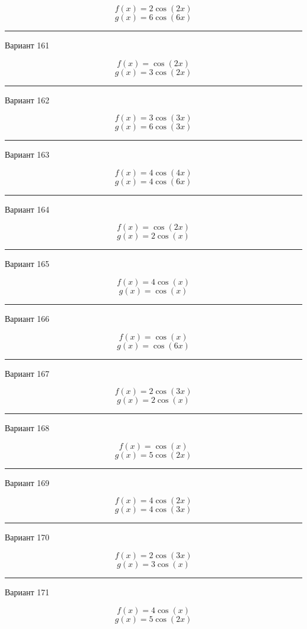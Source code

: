 \documentclass[11pt]{report}
\begin{document}
$$f(x)=2 \cos{\left(2 x \right)}$$
$$g(x)=6 \cos{\left(6 x \right)}$$

\rule{\textwidth}{.2mm}

Вариант 161

$$f(x)=\cos{\left(2 x \right)}$$
$$g(x)=3 \cos{\left(2 x \right)}$$

\rule{\textwidth}{.2mm}

Вариант 162

$$f(x)=3 \cos{\left(3 x \right)}$$
$$g(x)=6 \cos{\left(3 x \right)}$$

\rule{\textwidth}{.2mm}

Вариант 163

$$f(x)=4 \cos{\left(4 x \right)}$$
$$g(x)=4 \cos{\left(6 x \right)}$$

\rule{\textwidth}{.2mm}

Вариант 164

$$f(x)=\cos{\left(2 x \right)}$$
$$g(x)=2 \cos{\left(x \right)}$$

\rule{\textwidth}{.2mm}

Вариант 165

$$f(x)=4 \cos{\left(x \right)}$$
$$g(x)=\cos{\left(x \right)}$$

\rule{\textwidth}{.2mm}

Вариант 166

$$f(x)=\cos{\left(x \right)}$$
$$g(x)=\cos{\left(6 x \right)}$$

\rule{\textwidth}{.2mm}

Вариант 167

$$f(x)=2 \cos{\left(3 x \right)}$$
$$g(x)=2 \cos{\left(x \right)}$$

\rule{\textwidth}{.2mm}

Вариант 168

$$f(x)=\cos{\left(x \right)}$$
$$g(x)=5 \cos{\left(2 x \right)}$$

\rule{\textwidth}{.2mm}

Вариант 169

$$f(x)=4 \cos{\left(2 x \right)}$$
$$g(x)=4 \cos{\left(3 x \right)}$$

\rule{\textwidth}{.2mm}

Вариант 170

$$f(x)=2 \cos{\left(3 x \right)}$$
$$g(x)=3 \cos{\left(x \right)}$$

\rule{\textwidth}{.2mm}

Вариант 171

$$f(x)=4 \cos{\left(x \right)}$$
$$g(x)=5 \cos{\left(2 x \right)}$$
\end{document}
